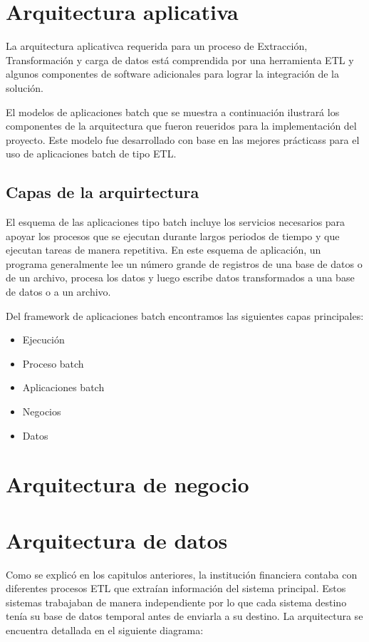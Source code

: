 \section{Arquitectura aplicativa}

La arquitectura aplicativca requerida para un proceso de Extracción, Transformación y carga de datos está comprendida por una herramienta ETL y algunos componentes de software adicionales para lograr la integración de la solución.

El modelos de aplicaciones batch que se muestra a continuación ilustrará los componentes de la arquitectura que fueron reueridos para la implementación del proyecto. Este modelo fue desarrollado con base en las mejores prácticass para el uso de aplicaciones batch de tipo ETL.

\subsection{Capas de la arquirtectura}
El esquema de las aplicaciones tipo batch incluye los servicios necesarios para apoyar los procesos que se ejecutan durante largos periodos de tiempo y que ejecutan tareas de manera repetitiva. En este esquema de aplicación, un programa generalmente lee un número grande de registros de una base de datos o de un archivo, procesa los datos y luego escribe datos transformados a una base de datos o a un archivo.

Del framework de aplicaciones batch encontramos las siguientes capas principales:
\begin{itemize}
\item Ejecución
\item Proceso batch
\item Aplicaciones batch
\item Negocios
\item Datos
\end{itemize}


\section{Arquitectura de negocio}


\section{Arquitectura de datos}

Como se explicó en los capitulos anteriores, la institución financiera contaba
con diferentes procesos ETL que extraían información del sistema
principal. Estos sistemas trabajaban de manera independiente por lo que cada
sistema destino tenía su base de datos temporal antes de enviarla a su
destino. La arquitectura se encuentra detallada en el siguiente diagrama:

